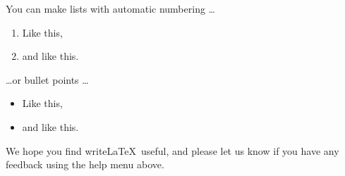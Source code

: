 \documentclass[a4paper,man, 12pt]{apa6}
\begin{document}
You can make lists with automatic numbering \dots

\begin{enumerate}
\item Like this,
\item and like this.
\end{enumerate}
\dots or bullet points \dots
\begin{itemize}
\item Like this,
\item and like this.
\end{itemize}

We hope you find write\LaTeX\ useful, and please let us know if you have any feedback using the help menu above.




\end{document}
